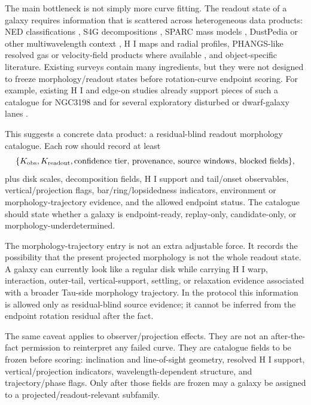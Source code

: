 \documentclass[11pt]{article}
\begin{document}
The main bottleneck is not simply more curve fitting.  The readout state of a
galaxy requires information that is scattered across heterogeneous data
products: NED classifications \cite{NED}, S4G decompositions
\cite{Sheth2010S4G}, SPARC mass models \cite{Lelli2016SPARC}, DustPedia or
other multiwavelength context \cite{Davies2017DustPedia}, H I maps and radial
profiles, PHANGS-like resolved gas or velocity-field products where available
\cite{Leroy2021PHANGSALMA}, and object-specific literature.  Existing surveys
contain many ingredients, but they were not designed to freeze
morphology/readout states before rotation-curve endpoint scoring.
For example, existing H I and edge-on studies already support pieces of such a
catalogue for NGC3198 \cite{Begeman1989NGC3198HI,Gentile2013HALOGASNGC3198,Schmidt2016THINGSRadialGas}
and for several exploratory disturbed or dwarf-galaxy lanes
\cite{deBlok2020IC2574HI,WalterBrinks1999IC2574Holes,SanchezSalcedo2002IC2574Holes,Swaters2009LateTypeDwarfs}.

This suggests a concrete data product: a residual-blind readout morphology
catalogue.  Each row should record at least
\[
\{K_{\rm obs},K_{\rm readout},\hbox{confidence tier, provenance, source windows,
blocked fields}\},
\]
plus disk scales, decomposition fields, H I support and tail/onset observables,
vertical/projection flags, bar/ring/lopsidedness indicators, environment or
morphology-trajectory evidence, and the allowed endpoint status.  The catalogue should
state whether a galaxy is endpoint-ready, replay-only, candidate-only, or
morphology-underdetermined.

The morphology-trajectory entry is not an extra adjustable force.  It records
the possibility that the present projected morphology is not the whole readout
state.  A galaxy can currently look like a regular disk while carrying H I
warp, interaction, outer-tail, vertical-support, settling, or relaxation
evidence associated with a broader Tau-side morphology trajectory.  In the
protocol this information is allowed only as residual-blind source evidence; it
cannot be inferred from the endpoint rotation residual after the fact.

The same caveat applies to observer/projection effects.  They are not an
after-the-fact permission to reinterpret any failed curve.  They are catalogue
fields to be frozen before scoring: inclination and line-of-sight geometry,
resolved H I support, vertical/projection indicators, wavelength-dependent
structure, and trajectory/phase flags.  Only after those fields are frozen may a
galaxy be assigned to a projected/readout-relevant subfamily.
\end{document}
